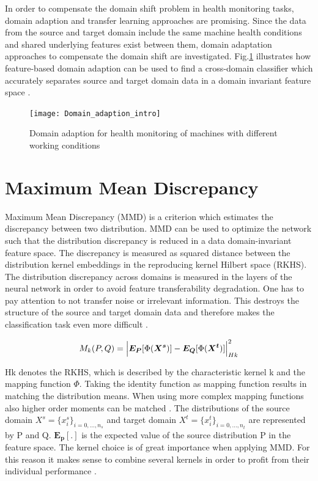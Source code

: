 In order to compensate the domain shift problem in health monitoring tasks, domain adaption and transfer learning approaches are promising. Since the data from the source and target domain include the same machine health conditions and shared underlying features exist between them, domain adaptation approaches to compensate the domain shift are investigated. Fig.\ref{fig:Domain_adaption_intro} illustrates how feature-based domain adaption can be used to find a cross-domain classifier which accurately separates source and target domain data in a domain invariant feature space \cite{Pandhare2021}.

\begin{figure}[htpb]
  \centering
  \texttt{[image: Domain\_adaption\_intro]}
  \caption {Domain adaption for health monitoring of machines with different working conditions \cite{Pandhare2021}} \label{fig:Domain_adaption_intro}
\end{figure}






\section{Maximum Mean Discrepancy}
Maximum Mean Discrepancy (MMD) is a criterion which estimates the discrepancy between two distribution. MMD can be used to optimize the network such that the distribution discrepancy is reduced in a data domain-invariant feature space. The discrepancy is measured as squared distance between the distribution kernel embeddings in the reproducing kernel Hilbert space (RKHS). The distribution discrepancy across domains is measured in the layers of the neural network in order to avoid feature transferability degradation. One has to pay attention to not transfer noise or irrelevant information. This destroys the structure of the source and target domain data and therefore makes the classification task even more difficult \cite{li2020domain}. 

\begin{align}
    M_{k}(P,Q) = \Bigl|  \boldsymbol{E_{P}}[\Phi(\boldsymbol{X^{s}})] - \boldsymbol{E_{Q}}[\Phi(\boldsymbol{X^{t}})]     \Bigl|^{2}_{Hk}
\end{align}

Hk denotes the RKHS, which is described by the characteristic kernel k and the mapping function $\Phi$. Taking the identity function as mapping function results in matching the distribution means. When using more complex mapping functions also higher order moments can be matched \cite{Yujia2015}. The distributions of the source domain $X^{s} = \{{x}_{i}^{s}\}_{i=0,...,n_{s}}$ and target domain $X^{t} = \{{x}_{i}^{t}\}_{i=0,...,n_{t}}$ are represented by P and Q. $\boldsymbol{E_{p}[.]}$ is the expected value of the source distribution P in the feature space. The kernel choice is of great importance when applying MMD. For this reason it makes sense to combine several kernels in order to profit from their individual performance \cite{li2020domain}.

